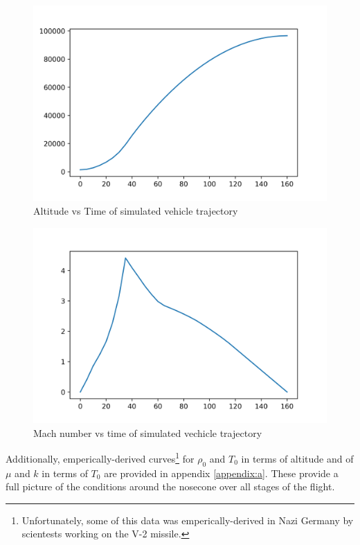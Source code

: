 \documentclass[twocolumn]{article}
\begin{document}
            \begin{subfigures}
                \begin{figure}[h]
                    \label{fig:alt}
                    \includegraphics[width=\linewidth]{altitude.png}
                    \caption{Altitude vs Time of simulated vehicle trajectory}
                \end{figure}
                \begin{figure}[h]
                    \label{fig:mach}
                    \includegraphics[width=\linewidth]{machs.png}
                    \caption{Mach number vs time of simulated vechicle trajectory}
                \end{figure}
            \end{subfigures}

            Additionally, emperically-derived curves\footnote{
                Unfortunately, some of this data was emperically-derived in Nazi 
                Germany by scientests working on the V-2 missile.}
            for $\rho_0$ and  $T_0$ in 
            terms of altitude and of $\mu$ and $k$ in terms of $T_0$ are 
            provided in appendix \ref{appendix:a}. These provide a full picture
            of the conditions around the nosecone over all stages of the flight.
\end{document}
